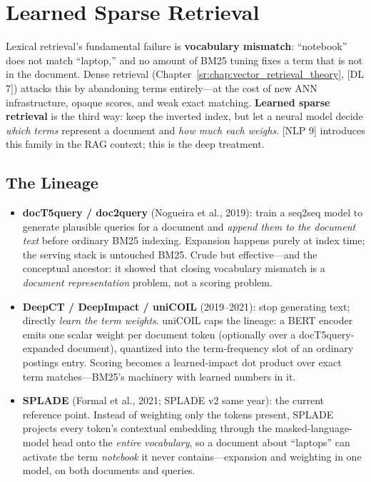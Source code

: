 \section{Learned Sparse Retrieval}
\label{sr:sec:learned_sparse}

Lexical retrieval's fundamental failure is \textbf{vocabulary mismatch}: ``notebook'' does not match ``laptop,'' and no amount of BM25 tuning fixes a term that is not in the document. Dense retrieval (Chapter~\ref{sr:chap:vector_retrieval_theory}, [DL 7]) attacks this by abandoning terms entirely---at the cost of new ANN infrastructure, opaque scores, and weak exact matching. \textbf{Learned sparse retrieval} is the third way: keep the inverted index, but let a neural model decide \emph{which terms} represent a document and \emph{how much each weighs}. [NLP 9] introduces this family in the RAG context; this is the deep treatment.

\subsection{The Lineage}

\begin{itemize}
    \item \textbf{docT5query / doc2query} (Nogueira et al., 2019): train a seq2seq model to generate plausible queries for a document and \emph{append them to the document text} before ordinary BM25 indexing. Expansion happens purely at index time; the serving stack is untouched BM25. Crude but effective---and the conceptual ancestor: it showed that closing vocabulary mismatch is a \emph{document representation} problem, not a scoring problem.
    \item \textbf{DeepCT / DeepImpact / uniCOIL} (2019--2021): stop generating text; directly \emph{learn the term weights}. uniCOIL caps the lineage: a BERT encoder emits one scalar weight per document token (optionally over a docT5query-expanded document), quantized into the term-frequency slot of an ordinary postings entry. Scoring becomes a learned-impact dot product over exact term matches---BM25's machinery with learned numbers in it.
    \item \textbf{SPLADE} (Formal et al., 2021; SPLADE v2 same year): the current reference point. Instead of weighting only the tokens present, SPLADE projects every token's contextual embedding through the masked-language-model head onto the \emph{entire vocabulary}, so a document about ``laptops'' can activate the term \emph{notebook} it never contains---expansion and weighting in one model, on both documents and queries.
\end{itemize}

